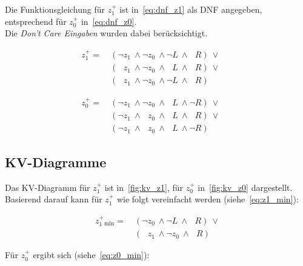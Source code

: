 Die Funktionsgleichung für $z_1^+$ ist in~\ref{eq:dnf_z1} als DNF angegeben, entsprechend für $z_0^+$ in~\ref{eq:dnf_z0}.\\
Die \textit{Don't Care Eingaben} wurden dabei berücksichtigt.

\begin{equation}\label{eq:dnf_z1}
\begin{alignat}{3}
    z_1^+ =\ &(\neg z_1 \ \land \neg z_0 \ \land \neg L \ \land \phantom{\neg} R)\ \lor &&  \\
    &(\phantom{\neg} z_1 \ \land \neg z_0 \ \land \phantom{\neg} L \ \land \phantom{\neg} R)\ \lor &&  \\
    &(\phantom{\neg} z_1 \ \land \neg z_0 \ \land \neg L \ \land \phantom{\neg} R)
\end{alignat}
\end{equation}

\begin{equation}\label{eq:dnf_z0}
\begin{alignat}{3}
    z_0^+ =\ &(\neg z_1 \ \land \neg z_0 \ \land \phantom{\neg} L \ \land \neg R)\ \lor &&  \\
    &(\neg z_1 \ \land \phantom{\neg} z_0 \ \land \phantom{\neg} L \ \land \phantom{\neg} R)\ \lor &&  \\
    &(\neg z_1 \ \land \phantom{\neg} z_0 \ \land \phantom{\neg} L \ \land \neg R)
\end{alignat}
\end{equation}

\subsection*{KV-Diagramme}

Das KV-Diagramm für $z_1^+$ ist in~\ref{fig:kv_z1}, für $z_0^+$ in~\ref{fig:kv_z0} dargestellt.\\
Basierend darauf kann für $z_1^+$ wie folgt vereinfacht werden (siehe~\ref{eq:z1_min}):

\begin{equation}\label{eq:z1_min}
\begin{alignat}{3}
    z_1^+_{\text{min}} =\ &(\neg z_0 \ \land \neg L \ \land \phantom{\neg} R)\ \lor   \\
    &(\phantom{\neg} z_1 \ \land \neg z_0 \ \land \phantom{\neg} R)
\end{alignat}
\end{equation}

\noindent
Für $z_0^+$ ergibt sich (siehe~\ref{eq:z0_min}):

